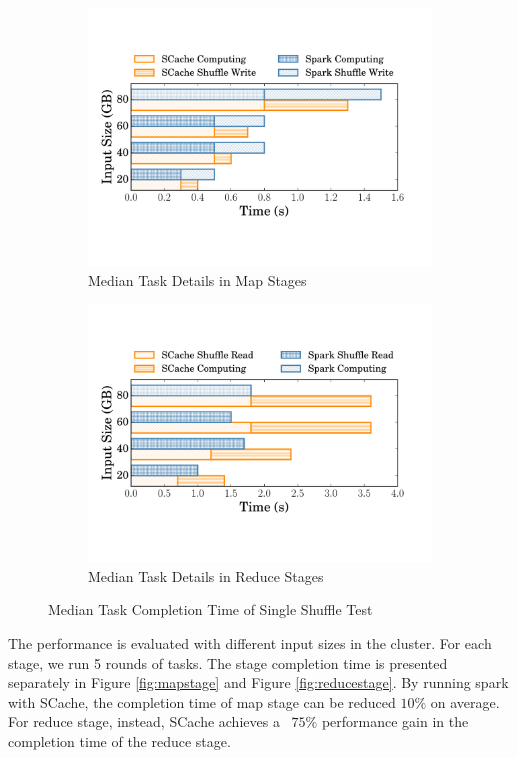 \begin{figure}
	\begin{subfigure}{\linewidth}
		\centering
		\includegraphics[width=0.9\linewidth]{fig/groupbymaptask}
		\caption{Median Task Details in Map Stages}
		\label{fig:maptask}
	\end{subfigure}
	\begin{subfigure}{\linewidth}
		\centering
		\includegraphics[width=0.9\linewidth]{fig/groupbyreducetask}
		\caption{Median Task Details in Reduce Stages}
		\label{fig:reducetask}
	\end{subfigure}
	\caption{Median Task Completion Time of Single Shuffle Test}
	\label{fig:singleshuffletask}
\end{figure}

The performance is evaluated with different input sizes in the cluster. For each stage, we run 5 rounds of tasks. The stage completion time is presented separately in Figure \ref{fig:mapstage} and Figure \ref{fig:reducestage}. By running spark with SCache, the completion time of map stage can be reduced $10\%$ on average. For reduce stage, instead, SCache achieves a ~$75\%$ performance gain in the completion time of the reduce stage.

